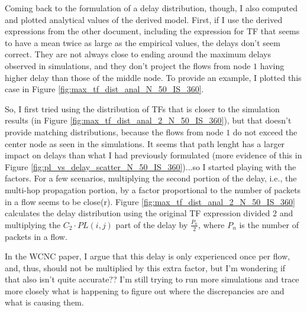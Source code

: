 \documentclass[conference]{IEEEtran}
\begin{document}
Coming back to the formulation of a delay distribution, though, I also computed and plotted analytical values of the derived model.  First, if I use the derived expressions from the other document, including the expression for TF that seems to have a mean twice as large as the empirical values, the delays don't seem correct.  They are not always close to ending around the maximum delays observed in simulations, and they don't project the flows from node $1$ having higher delay than those of the middle node.  To provide an example, I plotted this case in Figure \ref{fig:max_tf_dist_anal_N_50_IS_360}.

So, I first tried using the distribution of TFs that is closer to the simulation results (in Figure \ref{fig:max_tf_dist_anal_2_N_50_IS_360}), but that doesn't provide matching distributions, because the flows from node $1$ do not exceed the center node as seen in the simulations.  It seems that path lenght has a larger impact on delays than what I had previously formulated (more evidence of this in Figure \ref{fig:pl_vs_delay_scatter_N_50_IS_360})...so I started playing with the factors.  For a few scenarios, multiplying the second portion of the delay, i.e., the multi-hop propagation portion, by a factor proportional to the number of packets in a flow seems to be close(r).  Figure \ref{fig:max_tf_dist_anal_2_N_50_IS_360} calculates the delay distribution using the original TF expression divided $2$ and multiplying the $C_2 \cdot PL(i,j)$ part of the delay by $\frac{P_n}{2}$, where $P_n$ is the number of packets in a flow.  

In the WCNC paper, I argue that this delay is only experienced once per flow, and, thus, should not be multiplied by this extra factor, but I'm wondering if that also isn't quite accurate??  I'm still trying to run more simulations and trace more closely what is happening to figure out where the discrepancies are and what is causing them.
\end{document}
